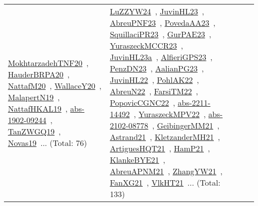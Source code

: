 {\begin{longtable}{lp{3cm}>{\raggedright\arraybackslash}p{6cm}>{\raggedright\arraybackslash}p{6cm}>{\raggedright\arraybackslash}p{8cm}}
\href{../works/MokhtarzadehTNF20.pdf}{MokhtarzadehTNF20}~\cite{MokhtarzadehTNF20}, \href{../works/HauderBRPA20.pdf}{HauderBRPA20}~\cite{HauderBRPA20}, \href{../works/NattafM20.pdf}{NattafM20}~\cite{NattafM20}, \href{../works/WallaceY20.pdf}{WallaceY20}~\cite{WallaceY20}, \href{../works/MalapertN19.pdf}{MalapertN19}~\cite{MalapertN19}, \href{../works/NattafHKAL19.pdf}{NattafHKAL19}~\cite{NattafHKAL19}, \href{../works/abs-1902-09244.pdf}{abs-1902-09244}~\cite{abs-1902-09244}, \href{../works/TanZWGQ19.pdf}{TanZWGQ19}~\cite{TanZWGQ19}, \href{../works/Novas19.pdf}{Novas19}~\cite{Novas19}... (Total: 76) & \href{../works/LuZZYW24.pdf}{LuZZYW24}~\cite{LuZZYW24}, \href{../works/JuvinHL23.pdf}{JuvinHL23}~\cite{JuvinHL23}, \href{../works/AbreuPNF23.pdf}{AbreuPNF23}~\cite{AbreuPNF23}, \href{../works/PovedaAA23.pdf}{PovedaAA23}~\cite{PovedaAA23}, \href{../works/SquillaciPR23.pdf}{SquillaciPR23}~\cite{SquillaciPR23}, \href{../works/GurPAE23.pdf}{GurPAE23}~\cite{GurPAE23}, \href{../works/YuraszeckMCCR23.pdf}{YuraszeckMCCR23}~\cite{YuraszeckMCCR23}, \href{../works/JuvinHL23a.pdf}{JuvinHL23a}~\cite{JuvinHL23a}, \href{../works/AlfieriGPS23.pdf}{AlfieriGPS23}~\cite{AlfieriGPS23}, \href{../works/PenzDN23.pdf}{PenzDN23}~\cite{PenzDN23}, \href{../works/AalianPG23.pdf}{AalianPG23}~\cite{AalianPG23}, \href{../works/JuvinHL22.pdf}{JuvinHL22}~\cite{JuvinHL22}, \href{../works/PohlAK22.pdf}{PohlAK22}~\cite{PohlAK22}, \href{../works/AbreuN22.pdf}{AbreuN22}~\cite{AbreuN22}, \href{../works/FarsiTM22.pdf}{FarsiTM22}~\cite{FarsiTM22}, \href{../works/PopovicCGNC22.pdf}{PopovicCGNC22}~\cite{PopovicCGNC22}, \href{../works/abs-2211-14492.pdf}{abs-2211-14492}~\cite{abs-2211-14492}, \href{../works/YuraszeckMPV22.pdf}{YuraszeckMPV22}~\cite{YuraszeckMPV22}, \href{../works/abs-2102-08778.pdf}{abs-2102-08778}~\cite{abs-2102-08778}, \href{../works/GeibingerMM21.pdf}{GeibingerMM21}~\cite{GeibingerMM21}, \href{../works/Astrand21.pdf}{Astrand21}~\cite{Astrand21}, \href{../works/KletzanderMH21.pdf}{KletzanderMH21}~\cite{KletzanderMH21}, \href{../works/ArtiguesHQT21.pdf}{ArtiguesHQT21}~\cite{ArtiguesHQT21}, \href{../works/HamP21.pdf}{HamP21}~\cite{HamP21}, \href{../works/KlankeBYE21.pdf}{KlankeBYE21}~\cite{KlankeBYE21}, \href{../works/AbreuAPNM21.pdf}{AbreuAPNM21}~\cite{AbreuAPNM21}, \href{../works/ZhangYW21.pdf}{ZhangYW21}~\cite{ZhangYW21}, \href{../works/FanXG21.pdf}{FanXG21}~\cite{FanXG21}, \href{../works/VlkHT21.pdf}{VlkHT21}~\cite{VlkHT21}... (Total: 133)\\

\end{longtable}}
